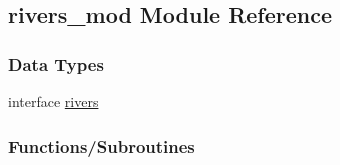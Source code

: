 \hypertarget{namespacerivers__mod}{}\subsection{rivers\+\_\+mod Module Reference}
\label{namespacerivers__mod}
\subsubsection*{Data Types}
\begin{DoxyCompactItemize}
\item 
interface \mbox{\hyperlink{structrivers__mod_1_1rivers}{rivers}}
\end{DoxyCompactItemize}
\subsubsection*{Functions/\+Subroutines}
